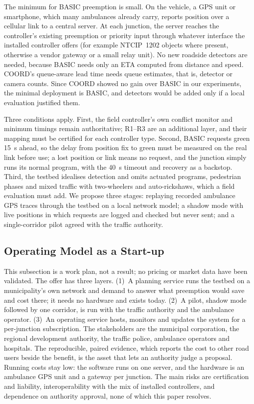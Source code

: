 \documentclass[conference]{IEEEtran}
\begin{document}
The minimum for BASIC preemption is small. On the vehicle, a GPS unit or smartphone, which many ambulances already carry, reports position over a cellular link to a central server. At each junction, the server reaches the controller's existing preemption or priority input through whatever interface the installed controller offers (for example NTCIP~1202 objects where present, otherwise a vendor gateway or a small relay unit). No new roadside detectors are needed, because BASIC needs only an ETA computed from distance and speed. COORD's queue-aware lead time needs queue estimates, that is, detector or camera counts. Since COORD showed no gain over BASIC in our experiments, the minimal deployment is BASIC, and detectors would be added only if a local evaluation justified them.

Three conditions apply. First, the field controller's own conflict monitor and minimum timings remain authoritative; R1--R3 are an additional layer, and their mapping must be certified for each controller type. Second, BASIC requests green 15~s ahead, so the delay from position fix to green must be measured on the real link before use; a lost position or link means no request, and the junction simply runs its normal program, with the 40~s timeout and recovery as a backstop. Third, the testbed idealises detection and omits actuated programs, pedestrian phases and mixed traffic with two-wheelers and auto-rickshaws, which a field evaluation must add. We propose three stages: replaying recorded ambulance GPS traces through the testbed on a local network model; a shadow mode with live positions in which requests are logged and checked but never sent; and a single-corridor pilot agreed with the traffic authority.

\subsection{Operating Model as a Start-up}

This subsection is a work plan, not a result; no pricing or market data have been validated. The offer has three layers. (1)~A planning service runs the testbed on a municipality's own network and demand to answer what preemption would save and cost there; it needs no hardware and exists today. (2)~A pilot, shadow mode followed by one corridor, is run with the traffic authority and the ambulance operator. (3)~An operating service hosts, monitors and updates the system for a per-junction subscription. The stakeholders are the municipal corporation, the regional development authority, the traffic police, ambulance operators and hospitals. The reproducible, paired evidence, which reports the cost to other road users beside the benefit, is the asset that lets an authority judge a proposal. Running costs stay low: the software runs on one server, and the hardware is an ambulance GPS unit and a gateway per junction. The main risks are certification and liability, interoperability with the mix of installed controllers, and dependence on authority approval, none of which this paper resolves.
\end{document}
